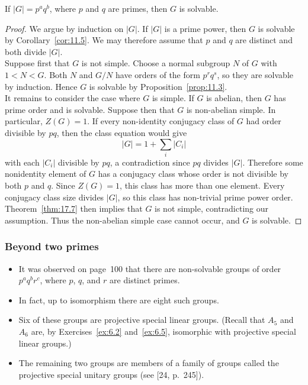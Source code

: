 \documentclass[../Odyssey_Project.tex]{subfiles}
\begin{document}
\begin{namedtheorem}
\label{thm:burnside-paqb}
If $|G| = p^a q^b$, where $p$ and $q$ are primes, then $G$ is solvable.
\end{namedtheorem}
\begin{proof}
    We argue by induction on $\lvert G\rvert$. If $\lvert G\rvert$ is a prime power, then $G$ is solvable by Corollary~\ref{cor:11.5}. We may therefore assume that $p$ and $q$ are distinct and both divide $\lvert G\rvert$.\\
    Suppose first that $G$ is not simple. Choose a normal subgroup $N$ of $G$ with $1<N<G$. Both $N$ and $G/N$ have orders of the form $p^r q^s$, so they are solvable by induction. Hence $G$ is solvable by Proposition~\ref{prop:11.3}.\\
    It remains to consider the case where $G$ is simple. If $G$ is abelian, then $G$ has prime order and is solvable. Suppose then that $G$ is non-abelian simple. In particular, $Z(G)=1$. If every non-identity conjugacy class of $G$ had order divisible by $pq$, then the class equation would give
    \[
        \lvert G\rvert=1+\sum_i \lvert C_i\rvert
    \]
    with each $\lvert C_i\rvert$ divisible by $pq$, a contradiction since $pq$ divides $\lvert G\rvert$. Therefore some nonidentity element of $G$ has a conjugacy class whose order is not divisible by both $p$ and $q$. Since $Z(G)=1$, this class has more than one element. Every conjugacy class size divides $\lvert G\rvert$, so this class has non-trivial prime power order. Theorem~\ref{thm:17.7} then implies that $G$ is not simple, contradicting our assumption. Thus the non-abelian simple case cannot occur, and $G$ is solvable.
\end{proof}

\subsubsection*{Beyond two primes}
\begin{itemize}
    \item It was observed on page~100 that there are non-solvable groups of order $p^a q^b r^c$, where $p$, $q$, and $r$ are distinct primes.
    \item In fact, up to isomorphism there are eight such groups.
    \item Six of these groups are projective special linear groups. (Recall that $A_5$ and $A_6$ are, by Exercises~\ref{ex:6.2} and~\ref{ex:6.5}, isomorphic with projective special linear groups.)
    \item The remaining two groups are members of a family of groups called the projective special unitary groups (see [24, p.~245]).
\end{itemize}
\end{document}
